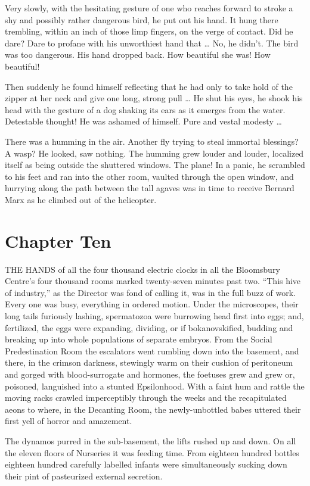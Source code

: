 \documentclass[12pt]{report}
\newcommand{\mychapter}[2]{
\setcounter{chapter}{#1}
    \setcounter{section}{0}
    \chapter*{#2}
    \addcontentsline{toc}{chapter}{#2}
}
\begin{document}
Very slowly, with the hesitating gesture of one who reaches forward to
stroke a shy and possibly rather dangerous bird, he put out his hand. It
hung there trembling, within an inch of those limp fingers, on the verge
of contact. Did he dare? Dare to profane with his unworthiest hand that
\ldots{} No, he didn't. The bird was too dangerous. His hand dropped
back. How beautiful she was! How beautiful!

Then suddenly he found himself reflecting that he had only to take hold
of the zipper at her neck and give one long, strong pull \ldots{} He
shut his eyes, he shook his head with the gesture of a dog shaking its
ears as it emerges from the water. Detestable thought! He was ashamed of
himself. Pure and vestal modesty \ldots{}

There was a humming in the air. Another fly trying to steal immortal
blessings? A wasp? He looked, saw nothing. The humming grew louder and
louder, localized itself as being outside the shuttered windows. The
plane! In a panic, he scrambled to his feet and ran into the other room,
vaulted through the open window, and hurrying along the path between the
tall agaves was in time to receive Bernard Marx as he climbed out of the
helicopter.

\mychapter{10}{Chapter Ten}
THE HANDS of all the four thousand electric clocks in all the Bloomsbury
Centre's four thousand rooms marked twenty-seven minutes past two.
``This hive of industry,'' as the Director was fond of calling it, was
in the full buzz of work. Every one was busy, everything in ordered
motion. Under the microscopes, their long tails furiously lashing,
spermatozoa were burrowing head first into eggs; and, fertilized, the
eggs were expanding, dividing, or if bokanovskified, budding and
breaking up into whole populations of separate embryos. From the Social
Predestination Room the escalators went rumbling down into the basement,
and there, in the crimson darkness, stewingly warm on their cushion of
peritoneum and gorged with blood-surrogate and hormones, the foetuses
grew and grew or, poisoned, languished into a stunted Epsilonhood. With
a faint hum and rattle the moving racks crawled imperceptibly through
the weeks and the recapitulated aeons to where, in the Decanting Room,
the newly-unbottled babes uttered their first yell of horror and
amazement.

The dynamos purred in the sub-basement, the lifts rushed up and down. On
all the eleven floors of Nurseries it was feeding time. From eighteen
hundred bottles eighteen hundred carefully labelled infants were
simultaneously sucking down their pint of pasteurized external
secretion.
\end{document}
